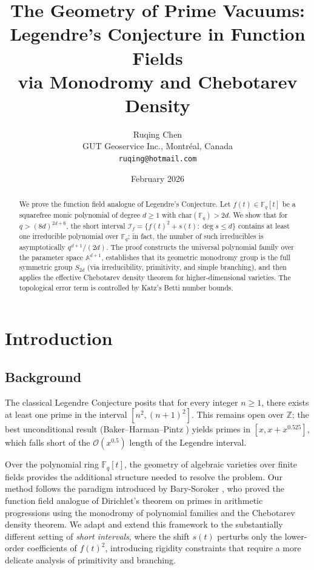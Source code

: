 \documentclass[11pt, a4paper]{article}
\title{\textbf{The Geometry of Prime Vacuums: \\
Legendre's Conjecture in Function Fields \\
via Monodromy and Chebotarev Density}}
\author{Ruqing Chen\\[4pt]
\small GUT Geoservice Inc., Montr\'eal, Canada\\[2pt]
\small \texttt{ruqing@hotmail.com}}
\date{February 2026}
\theoremstyle{definition}
\theoremstyle{remark}
\newcommand{\Fq}{\mathbb{F}_q}
\newcommand{\Affine}{\mathbb{A}}
\begin{document}
\maketitle

\begin{abstract}
We prove the function field analogue of Legendre's Conjecture.
Let $f(t) \in \Fq[t]$ be a squarefree monic polynomial of degree
$d \ge 1$ with $\mathrm{char}(\Fq) > 2d$.
We show that for $q > (8d)^{2d+6}$,
the short interval
$\mathcal{I}_f = \{f(t)^2 + s(t) : \deg s \le d\}$
contains at least one irreducible polynomial over $\Fq$;
in fact, the number of such irreducibles is asymptotically
$q^{d+1}/(2d)$.
The proof constructs the universal polynomial family over the
parameter space $\Affine^{d+1}$, establishes that its geometric
monodromy group is the full symmetric group $S_{2d}$
(via irreducibility, primitivity, and simple branching), and
then applies the effective Chebotarev density theorem for
higher-dimensional varieties.
The topological error term is controlled by Katz's Betti
number bounds.
\end{abstract}

\bigskip

\section{Introduction}\label{sec:intro}

\subsection{Background}
The classical Legendre Conjecture posits that for every integer
$n \ge 1$, there exists at least one prime in the interval
$[n^2,(n+1)^2]$.
This remains open over $\mathbb{Z}$; the best unconditional result
(Baker--Harman--Pintz \cite{BHP2001}) yields primes in
$[x, x + x^{0.525}]$, which falls short of the
$\mathcal{O}(x^{0.5})$ length of the Legendre interval.

Over the polynomial ring $\Fq[t]$, the geometry of algebraic
varieties over finite fields provides the additional structure
needed to resolve the problem.
Our method follows the paradigm introduced by
Bary-Soroker \cite{barysoroker2012}, who proved the function field
analogue of Dirichlet's theorem on primes in arithmetic progressions
using the monodromy of polynomial families and the Chebotarev density
theorem.
We adapt and extend this framework to the substantially different
setting of \emph{short intervals}, where the shift $s(t)$ perturbs
only the lower-order coefficients of $f(t)^2$, introducing rigidity
constraints that require a more delicate analysis of primitivity
and branching.
\end{document}

